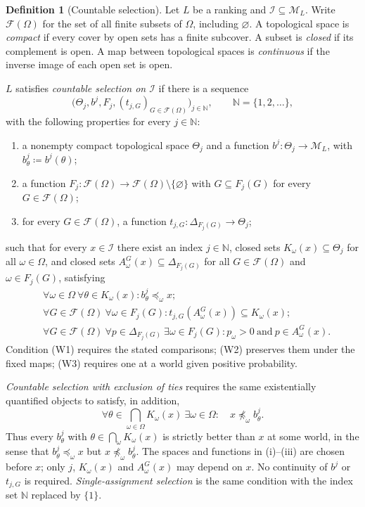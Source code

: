 \documentclass[11pt]{article}
\theoremstyle{definition}
\newtheorem{definition}[theorem]{Definition}
\theoremstyle{remark}
\newcommand{\M}{\mathcal M}
\newcommand{\I}{\mathcal I}
\begin{document}
\begin{definition}[Countable selection]\label{def:selection}\label{def:family}
Let $L$ be a ranking and $\I\subseteq\M_L$. Write $\mathcal F(\Omega)$ for the set of all finite subsets of $\Omega$, including $\varnothing$. A topological space is \emph{compact} if every cover by open sets has a finite subcover. A subset is \emph{closed} if its complement is open. A map between topological spaces is \emph{continuous} if the inverse image of each open set is open.

$L$ satisfies \emph{countable selection on $\I$} if there is a sequence
\[
\bigl(\Theta_j,b^j,F_j,(t_{j,G})_{G\in\mathcal F(\Omega)}\bigr)_{j\in\mathbb N},\qquad \mathbb N=\{1,2,\ldots\},
\]
with the following properties for every $j\in\mathbb N$:
\begin{enumerate}[label=(\roman*)]
\item a nonempty compact topological space $\Theta_j$ and a function $b^j:\Theta_j\to\M_L$, with $b^j_\theta\coloneqq b^j(\theta)$;
\item a function $F_j:\mathcal F(\Omega)\to\mathcal F(\Omega)\setminus\{\varnothing\}$ with $G\subseteq F_j(G)$ for every $G\in\mathcal F(\Omega)$;
\item for every $G\in\mathcal F(\Omega)$, a function $t_{j,G}:\Delta_{F_j(G)}\to\Theta_j$;
\end{enumerate}
such that for every $x\in\I$ there exist an index $j\in\mathbb N$, closed sets $K_\omega(x)\subseteq\Theta_j$ for all $\omega\in\Omega$, and closed sets $A^G_\omega(x)\subseteq\Delta_{F_j(G)}$ for all $G\in\mathcal F(\Omega)$ and $\omega\in F_j(G)$, satisfying
\begin{align}
&\forall\omega\in\Omega\ \forall\theta\in K_\omega(x):
 b^j_\theta\preceq_\omega x;\tag{W1}\label{eq:comparison}\\
&\forall G\in\mathcal F(\Omega)\ \forall\omega\in F_j(G):
 t_{j,G}(A^G_\omega(x))\subseteq K_\omega(x);\tag{W2}\label{eq:compatibility}\\
&\forall G\in\mathcal F(\Omega)\ \forall p\in\Delta_{F_j(G)}\
 \exists\omega\in F_j(G):
 p_\omega>0\ \text{and}\ p\in A^G_\omega(x).\tag{W3}\label{eq:support}
\end{align}
Condition (W1) requires the stated comparisons; (W2) preserves them under the fixed maps; (W3) requires one at a world given positive probability.

\emph{Countable selection with exclusion of ties} requires the same existentially quantified objects to satisfy, in addition,
\[
\forall\theta\in\bigcap_{\omega\in\Omega}K_\omega(x)\
\exists\omega\in\Omega:\quad x\not\preceq_\omega b^j_\theta.
\tag{W4}\label{eq:notie}
\]
Thus every $b^j_\theta$ with $\theta\in\bigcap_\omega K_\omega(x)$ is strictly better than $x$ at some world, in the sense that $b^j_\theta\preceq_\omega x$ but $x\not\preceq_\omega b^j_\theta$. The spaces and functions in (i)--(iii) are chosen before $x$; only $j$, $K_\omega(x)$ and $A^G_\omega(x)$ may depend on $x$. No continuity of $b^j$ or $t_{j,G}$ is required. \emph{Single-assignment selection} is the same condition with the index set $\mathbb N$ replaced by $\{1\}$.
\end{definition}
\end{document}
